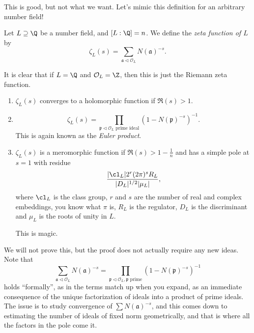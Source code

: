 \documentclass[a4paper]{article}
\begin{document}
This is good, but not what we want. Let's mimic this definition for an arbitrary number field!

\begin{defi}
  Let $L \supseteq \Q$ be a number field, and $[L:\Q] = n$. We define the \emph{zeta function of $L$} by
  \[
    \zeta_L(s) = \sum_{\mathfrak{a} \lhd \mathcal{O}_L} N(\mathfrak{a})^{-s}.
  \]
\end{defi}
It is clear that if $L = \Q$ and $\mathcal{O}_L = \Z$, then this is just the Riemann zeta function.

\begin{thm}\leavevmode
  \begin{enumerate}
    \item $\zeta_L(s)$ converges to a holomorphic function if $\Re(s) > 1$.
      \setcounter{enumi}{2}
    \item
      \[
        \zeta_L(s) = \prod_{\mathfrak{p} \lhd \mathcal{O}_L\text{ prime ideal}} (1 - N(\mathfrak{p})^{-s})^{-1}.
      \]
      This is again known as the \emph{Euler product}.
      \setcounter{enumi}{1}
    \item $\zeta_L(s)$ is a meromorphic function if $\Re(s) > 1 - \frac{1}{n}$ and has a simple pole at $s = 1$ with residue
      \[
        \frac{|\cl_L| 2^r(2\pi)^s R_L}{|D_L|^{1/2} |\mu_L|},
      \]
      where $\cl_L$ is the class group, $r$ and $s$ are the number of real and complex embeddings, you know what $\pi$ is, $R_L$ is the regulator, $D_L$ is the discriminant and $\mu_L$ is the roots of unity in $L$.

      This is magic.
  \end{enumerate}
\end{thm}
We will not prove this, but the proof does not actually require any new ideas. Note that
\[
  \sum_{\mathfrak{a} \lhd \mathcal{O}_L} N(\mathfrak{a})^{-s} = \prod_{\mathfrak{p} \lhd \mathcal{O}_L,\mathfrak{p}\text{ prime}} (1 - N(\mathfrak{p})^{-s})^{-1}
\]
holds ``formally'', as in the terms match up when you expand, as an immediate consequence of the unique factorization of ideals into a product of prime ideals. The issue is to study convergence of $\sum N(\mathfrak{a})^{-s}$, and this comes down to estimating the number of ideals of fixed norm geometrically, and that is where all the factors in the pole come it.
\end{document}
